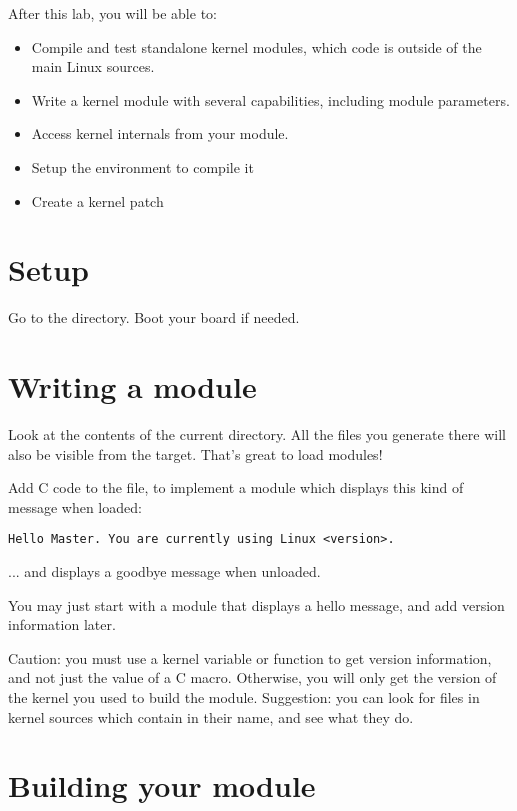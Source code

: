 
After this lab, you will be able to:

\begin{itemize}
\item Compile and test standalone kernel modules, which code is outside of the main Linux sources.
\item Write a kernel module with several capabilities, including module parameters.
\item Access kernel internals from your module.
\item Setup the environment to compile it
\item Create a kernel patch
\end{itemize}

\section{Setup}

Go to the  directory.
Boot your board if needed.

\section{Writing a module}

Look at the contents of the current directory. All the files you generate
there will also be visible from the target. That's great to load
modules!

Add C code to the  file, to implement a module which
displays this kind of message when loaded:

\begin{verbatim}
Hello Master. You are currently using Linux <version>.
\end{verbatim}

... and displays a goodbye message when unloaded.

You may just start with a module that displays a hello message, and
add version information later.

Caution: you must use a kernel variable or function to get version
information, and not just the value of a C macro. Otherwise, you will
only get the version of the kernel you used to build the
module. Suggestion: you can look for files in kernel sources which
contain  in their name, and see what they do.

\section{Building your module}


